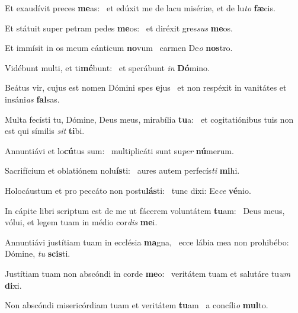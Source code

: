 \item Et exaudívit preces \textbf{me}as:~\psstar{} et edúxit me de lacu misériæ, et de lu\textit{to} \textbf{fæ}cis.

\item Et státuit super petram pedes \textbf{me}os:~\psstar{} et diréxit gres\textit{sus} \textbf{me}os.

\item Et immísit in os meum cánticum \textbf{no}vum~\psstar{} carmen De\textit{o} \textbf{nos}tro.

\item Vidébunt multi, et ti\textbf{mé}bunt:~\psstar{} et sperábunt \textit{in} \textbf{Dó}mino.

\item Beátus vir, cujus est nomen Dómini spes \textbf{e}jus~\psstar{} et non respéxit in vanitátes et insáni\textit{as} \textbf{fal}sas.

\item Multa fecísti tu, Dómine, Deus meus, mirabília \textbf{tu}a:~\psstar{} et cogitatiónibus tuis non est qui símilis \textit{sit} \textbf{ti}bi.

\item Annuntiávi et lo\textbf{cú}tus sum:~\psstar{} multiplicáti sunt su\textit{per} \textbf{nú}merum.

\item Sacrifícium et oblatiónem nolu\textbf{ís}ti:~\psstar{} aures autem perfecís\textit{ti} \textbf{mi}hi.

\item Holocáustum et pro peccáto non postu\textbf{lás}ti:~\psstar{} tunc dixi: Ec\textit{ce} \textbf{vé}nio.

\item In cápite libri scriptum est de me ut fácerem voluntátem \textbf{tu}am:~\psstar{} Deus meus, vólui, et legem tuam in médio cor\textit{dis} \textbf{me}i.

\item Annuntiávi justítiam tuam in ecclésia \textbf{ma}gna,~\psstar{} ecce lábia mea non prohibébo: Dómine, \textit{tu} \textbf{scis}ti.

\item Justítiam tuam non abscóndi in corde \textbf{me}o:~\psstar{} veritátem tuam et salutáre tu\textit{um} \textbf{di}xi.

\item Non abscóndi misericórdiam tuam et veritátem \textbf{tu}am~\psstar{} a concíli\textit{o} \textbf{mul}to.

